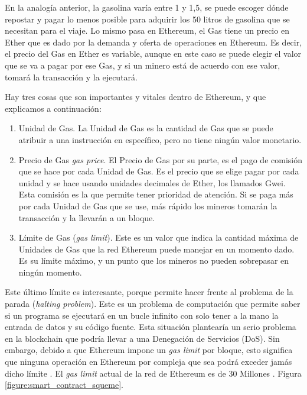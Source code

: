       En la analogía anterior, la gasolina varía entre 1 y 1,5, se puede escoger dónde repostar y pagar lo 
      menos 
      posible para adquirir los 50 litros de gasolina que se necesitan para el viaje. Lo mismo pasa en 
      Ethereum, el Gas tiene un precio en Ether que es dado por la demanda y oferta de operaciones en 
      Ethereum. Es decir, el precio del Gas en Ether es variable, aunque en este caso se puede elegir el 
      valor que se va a pagar por ese Gas, y si un minero está de acuerdo con ese valor, tomará la 
      transacción y la ejecutará.

      Hay tres cosas que son importantes y vitales dentro de Ethereum, y que explicamos a continuación:

      \begin{enumerate}
        \item Unidad de Gas. La Unidad de Gas es la cantidad de Gas que se puede atribuir a una instrucción 
        en específico, pero no tiene ningún valor monetario.
        \item Precio de Gas \textit{gas price}. El Precio de Gas por su parte, es el pago de comisión que se hace por cada Unidad de Gas. Es el precio que se elige pagar por cada unidad y se hace usando unidades decimales de Ether, los llamados Gwei. Esta comisión es la que permite tener prioridad de atención. Si se paga más por cada Unidad de Gas que se use, más rápido los mineros tomarán la transacción y la llevarán a un bloque.
        \item Límite de Gas (\textit{gas limit}). Este es un valor que indica la cantidad máxima de Unidades de Gas que la red 
        Ethereum puede manejar en un momento dado. Es su límite máximo, y un punto que los mineros no 
        pueden sobrepasar en ningún momento.
      \end{enumerate}


      Este último límite es interesante, porque permite hacer frente al problema de la parada 
      (\textit{halting problem}). Este es un 
      problema de computación que permite saber si un programa se ejecutará en un bucle 
      infinito con solo tener a la mano la entrada de datos y su código fuente. Esta situación plantearía un 
      serio problema en la blockchain que podría llevar a una Denegación de Servicios (DoS). Sin embargo, 
      debido a que Ethereum impone un \textit{gas limit} por bloque, esto significa que ninguna operación en 
      Ethereum por compleja que sea podrá exceder jamás dicho límite \parencite{bit2meacademy}. El \textit{gas limit} actual de la red de Ethereum es de 30 Millones \parencite{ycharts}. Figura 
      \ref{figure:smart_contract_squeme}.


